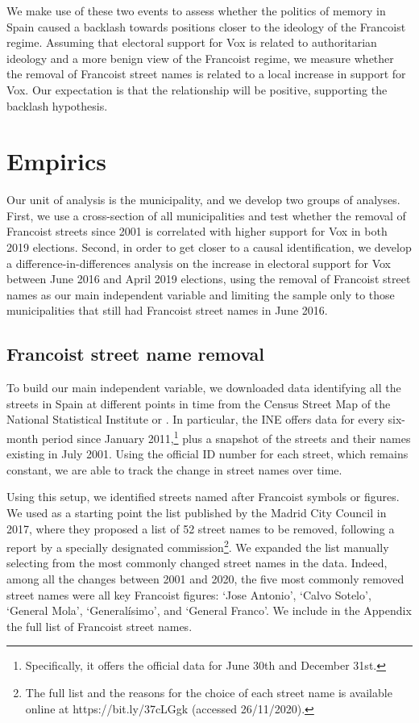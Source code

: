 \documentclass[12pt, notitlepage]{article}
\begin{document}
We make use of these two events to assess whether the politics of memory in Spain caused a backlash towards positions closer to the ideology of the Francoist regime.
Assuming that electoral support for Vox is related to authoritarian ideology and a more benign view of the Francoist regime, we measure whether the removal of Francoist street names is related to a local increase in support for Vox.
Our expectation is that the relationship will be positive, supporting the backlash hypothesis.

\section*{Empirics}

Our unit of analysis is the municipality, and we develop two groups of analyses.
First, we use a cross-section of all municipalities and test whether the removal of Francoist streets since 2001 is correlated with higher support for Vox in both 2019 elections.
Second, in order to get closer to a causal identification, we develop a difference-in-differences analysis on the increase in electoral support for Vox between June 2016 and April 2019 elections, using the removal of Francoist street names as our main independent variable and limiting the sample only to those municipalities that still had Francoist street names in June 2016.

\subsection*{Francoist street name removal}

To build our main independent variable, we downloaded data identifying all the streets in Spain at different points in time from the Census Street Map of the National Statistical Institute or \citet{INE:2020aa}.
In particular, the INE offers data for every six-month period since January 2011,\footnote{Specifically, it offers the official data for June 30th and December 31st.} plus a snapshot of the streets and their names existing in July 2001.
Using the official ID number for each street, which remains constant, we are able to track the change in street names over time.

Using this setup, we identified streets named after Francoist symbols or figures.
We used as a starting point the list published by the Madrid City Council in 2017, where they proposed a list of 52 street names to be removed, following a report by a specially designated commission\footnote{The full list and the reasons for the choice of each street name is available online at https://bit.ly/37cLGgk (accessed 26/11/2020).}.
We expanded the list manually selecting from the most commonly changed street names in the data.
Indeed, among all the changes between 2001 and 2020, the five most commonly removed street names were all key Francoist figures: `Jose Antonio', `Calvo Sotelo', `General Mola', `Generalísimo', and `General Franco'.
We include in the Appendix the full list of Francoist street names.
\end{document}
